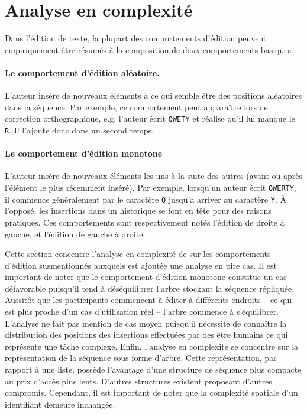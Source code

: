 
\section{Analyse en complexité}
\label{repl:sec:complexity}

Dans l'édition de texte, la plupart des comportements d'édition peuvent
empiriquement être résumés à la composition de deux comportements basiques.

\paragraph{Le comportement d'édition aléatoire.} L'auteur insère de nouveaux
éléments à ce qui semble être des positions aléatoires dans la séquence. Par
exemple, ce comportement peut apparaître lors de correction orthographique,
e.g. l'auteur écrit \texttt{QWETY} et réalise qu'il lui manque le \texttt{R}. Il
l'ajoute donc dans un second temps.

\paragraph{Le comportement d'édition monotone} L'auteur insère de nouveaux
éléments les uns à la suite des autres (avant ou après l'élément le plus
récemment inséré). Par exemple, lorsqu'un auteur écrit \texttt{QWERTY}, il
commence généralement par le caractère \texttt{Q} jusqu'à arriver au caractère
\texttt{Y}. À l'opposé, les insertions dans un historique se font en tête pour
des raisons pratiques. Ces comportements sont respectivement notés l'édition de
droite à gauche, et l'édition de gauche à droite.

Cette section concentre l'analyse en complexité de \LSEQ sur les comportements
d'édition susmentionnés auxquels est ajoutée une analyse en pire cas. Il est
important de noter que le comportement d'édition monotone constitue un cas
défavorable puisqu'il tend à déséquilibrer l'arbre stockant la séquence
répliquée. Aussitôt que les participants commencent à éditer à différents
endroits -- ce qui est plus proche d'un cas d'utilisation réel -- l'arbre
commence à s'équilibrer.
L'analyse ne fait pas mention de cas moyen puisqu'il nécessite de connaître la
distribution des positions des insertions effectuées par des être humains ce qui
représente une tâche complexe. Enfin, l'analyse en complexité se concentre sur
la représentation de la séquence sous forme d'arbre. Cette représentation, par
rapport à une liste, possède l'avantage d'une structure de séquence plus
compacte au prix d'accès plus lents.  D'autres structures existent proposant
d'autres compromis. Cependant, il est important de noter que la complexité
spatiale d'un identifiant demeure inchangée.

